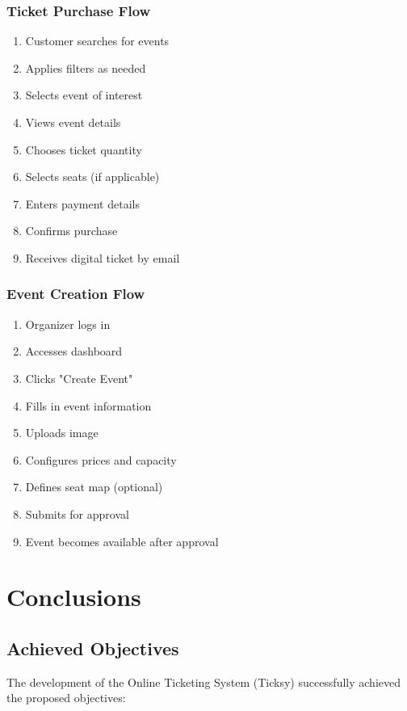 \documentclass[12pt,a4paper]{article}
\begin{document}
\subsubsection{Ticket Purchase Flow}
\begin{enumerate}
    \item Customer searches for events
    \item Applies filters as needed
    \item Selects event of interest
    \item Views event details
    \item Chooses ticket quantity
    \item Selects seats (if applicable)
    \item Enters payment details
    \item Confirms purchase
    \item Receives digital ticket by email
\end{enumerate}

\subsubsection{Event Creation Flow}
\begin{enumerate}
    \item Organizer logs in
    \item Accesses dashboard
    \item Clicks "Create Event"
    \item Fills in event information
    \item Uploads image
    \item Configures prices and capacity
    \item Defines seat map (optional)
    \item Submits for approval
    \item Event becomes available after approval
\end{enumerate}

\section{Conclusions}

\subsection{Achieved Objectives}

The development of the Online Ticketing System (Ticksy) successfully achieved the proposed objectives:
\end{document}
